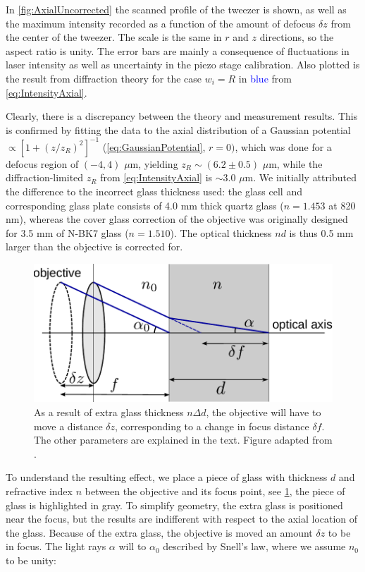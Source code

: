 In \cref{fig:AxialUncorrected} the scanned profile of the tweezer is shown, as well as the maximum intensity recorded as a function of the amount of defocus $\delta z$ from the center of the tweezer.
The scale is the same in $r$ and $z$ directions, so the aspect ratio is unity.
The error bars are mainly a consequence of fluctuations in laser intensity as well as uncertainty in the piezo stage calibration.
Also plotted is the result from diffraction theory for the case $w_i =R$ in \textcolor{blue}{blue} from \cref{eq:IntensityAxial}.

Clearly, there is a discrepancy between the theory and measurement results.
This is confirmed by fitting the data to the axial distribution of a Gaussian potential $\propto [1+(z/z_R)^2]^{-1}$ (\cref{eq:GaussianPotential}, $r=0)$, which was done for a defocus region of $(-4, 4)$ $\mu$m, yielding $z_R \sim (6.2\pm0.5)$ $\mu$m, while the diffraction-limited $z_R$ from \cref{eq:IntensityAxial} is $\sim 3.0$ $\mu$m.
We initially attributed the difference to the incorrect glass thickness used: the glass cell and corresponding glass plate consists of 4.0 mm thick quartz glass ($n=1.453$ at 820 nm), whereas the cover glass correction of the objective was originally designed for 3.5 mm of N-BK7 glass ($n=1.510$).
The optical thickness $nd$ is thus 0.5 mm larger than the objective is corrected for. 
\begin{figure}[]
    \centering
    \includegraphics[width=0.6\linewidth]{figures/sphericalAberration.pdf}
    \caption{As a result of extra glass thickness $n\Delta d$, the objective will have to move a distance $\delta z$, corresponding to a change in focus distance $\delta f$.
    The other parameters are explained in the text.
    Figure adapted from \cite{Iwaniuk2011}.}
    \label{fig:SphericalSketch}
\end{figure}
To understand the resulting effect, we place a piece of glass with thickness $d$ and refractive index $n$ between the objective and its focus point, see \cref{fig:SphericalSketch}, the piece of glass is highlighted in gray.
To simplify geometry, the extra glass is positioned near the focus, but the results are indifferent with respect to the axial location of the glass.
Because of the extra glass, the objective is moved an amount $\delta z$ to be in focus.
The light rays $\alpha$ will to $\alpha_0$ described by Snell's law, where we assume $n_0$ to be unity:

